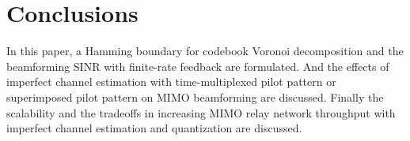 \documentclass[10pt,fleqn, twocolumn]{IEEEtran}
\begin{document}
\section{Conclusions}
In this paper, a Hamming boundary for codebook Voronoi
decomposition and the beamforming SINR with finite-rate feedback
are formulated. And the effects of imperfect channel estimation
with time-multiplexed pilot pattern or superimposed pilot pattern
on MIMO beamforming are discussed. Finally the scalability and the
tradeoffs in increasing MIMO relay network throughput with
imperfect channel estimation and quantization are discussed.

\small


\end{document}
